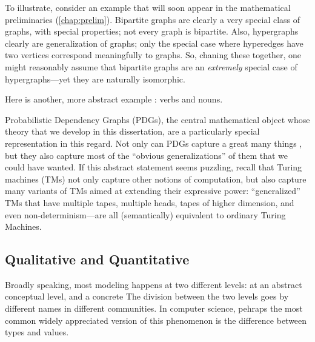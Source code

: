To illustrate, consider an example that will soon appear in the mathematical preliminaries (\cref{chap:prelim}). 
Bipartite graphs are clearly a very special class of graphs, with special properties; not every graph is bipartite. 
Also, hypergraphs clearly are generalization of graphs; only the special case where hyperedges have two vertices correspond meaningfully to graphs. 
So, chaning these together, one might reasonably assume that bipartite graphs are an \emph{extremely} special case of hypergraphs---yet they are naturally isomorphic. 


Here is another, more abstract example : verbs and nouns.

\TODO


Probabilistic Dependency Graphs (PDGs), the central mathematical object whose theory that we develop in this dissertation, are a particularly special representation in this regard. 
Not only can PDGs capture a great many things 
\unskip, but they also capture most of the ``obvious generalizations'' of them that we could have wanted. 
If this abstract statement seems puzzling, recall that Turing machines (TMs) not only capture other notions of computation, but also capture many variants of TMs aimed at extending their expressive power: ``generalized'' TMs that have multiple tapes, multiple heads, tapes of higher dimension, and even non-determinism---are all (semantically) equivalent to ordinary Turing Machines. 



\subsection{Qualitative and Quantitative}

Broadly speaking, most modeling happens at two different levels: 
    at an abstract conceptual level, and a concrete 
The division between the two levels goes by different names in different communities. 
In computer science, pehraps the most common
    widely appreciated version of this phenomenon is 
    the difference between types and values.
    
